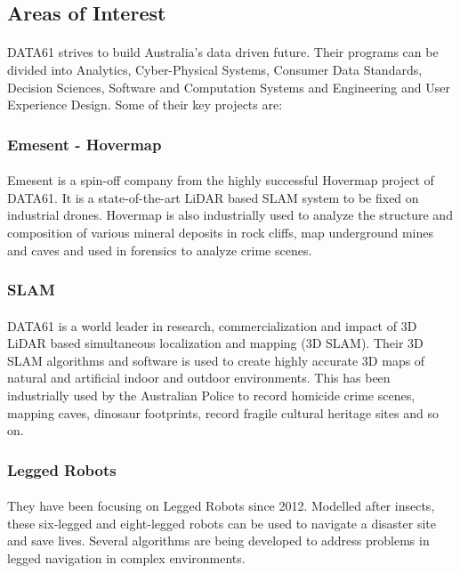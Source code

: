 \subsection{Areas of Interest}

\paragraph{}
DATA61 strives to build Australia's data driven future. Their programs can be divided into Analytics, Cyber-Physical Systems, Consumer Data Standards, Decision Sciences, Software and Computation Systems and Engineering and User Experience Design. Some of their key projects are:

\subsubsection*{Emesent - Hovermap}
\paragraph{}
Emesent is a spin-off company from the highly successful Hovermap project of DATA61. It is a state-of-the-art LiDAR based SLAM system to be fixed on industrial drones. Hovermap is also industrially used to analyze the structure and composition of various mineral deposits in rock cliffs, map underground mines and caves and used in forensics to analyze crime scenes.

\subsubsection*{SLAM}
\paragraph{}
DATA61 is a world leader in research, commercialization and impact of 3D LiDAR based simultaneous localization and mapping (3D SLAM). Their 3D SLAM algorithms and software is used to create highly accurate 3D maps of natural and artificial indoor and outdoor environments. This has been industrially used by the Australian Police to record homicide crime scenes, mapping caves, dinosaur footprints, record fragile cultural heritage sites and so on.

\subsubsection*{Legged Robots}
\paragraph{}
They have been focusing on Legged Robots since 2012. Modelled after insects, these six-legged and eight-legged robots can be used to navigate a disaster site and save lives. Several algorithms are being developed to address problems in legged navigation in complex environments.


